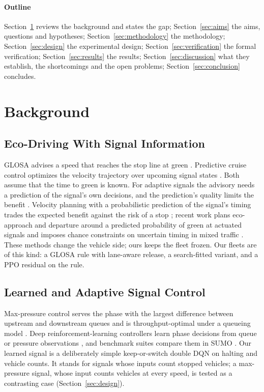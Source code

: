 \paragraph{Outline} Section~\ref{sec:background} reviews the background and states the gap; Section~\ref{sec:aims} the aims,
questions and hypotheses; Section~\ref{sec:methodology} the methodology; Section~\ref{sec:design} the experimental design;
Section~\ref{sec:verification} the formal verification; Section~\ref{sec:results} the results; Section~\ref{sec:discussion} what they
establish, the shortcomings and the open problems; Section~\ref{sec:conclusion} concludes.

\section{Background}\label{sec:background}
\subsection{Eco-Driving With Signal Information}
GLOSA advises a speed that reaches the stop line at green \cite{katsaros2011}. Predictive cruise control optimizes the velocity trajectory
over upcoming signal states \cite{asadi2011}. Both assume that the time to green is known. For adaptive signals the advisory needs a
prediction of the signal's own decisions, and the prediction's quality limits the benefit \cite{bodenheimer2014}. Velocity planning with a
probabilistic prediction of the signal's timing trades the expected benefit against the risk of a stop \cite{mahler2014}; recent work
plans eco-approach and departure around a predicted probability of green at actuated signals \cite{li2025ead} and imposes chance
constraints on uncertain timing in mixed traffic \cite{xue2026cc}. These methods change the vehicle side; ours keeps the fleet frozen. Our fleets are of
this kind: a GLOSA rule with lane-aware release, a search-fitted variant, and a PPO residual on the rule.

\subsection{Learned and Adaptive Signal Control}
Max-pressure control serves the phase with the largest difference between upstream and downstream queues and is throughput-optimal under a
queueing model \cite{varaiya2013}. Deep reinforcement-learning controllers learn phase decisions from queue or pressure observations
\cite{wei2018,wei2019}, and benchmark suites compare them in SUMO \cite{ault2021}. Our learned signal is a deliberately simple
keep-or-switch double DQN \cite{vanhasselt2016} on halting and vehicle counts. It stands for signals whose inputs count stopped vehicles; a
max-pressure signal, whose input counts vehicles at every speed, is tested as a contrasting case (Section~\ref{sec:design}).

